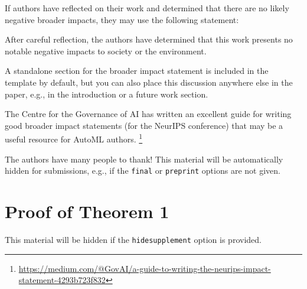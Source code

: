 \documentclass[11pt]{article}
\begin{document}
If authors have reflected on their work and determined that there are no likely
negative broader impacts, they may use the following statement:

\begin{displayquote}
  After careful reflection, the authors have determined that this work presents no notable
  negative impacts to society or the environment.
\end{displayquote}

A standalone section for the broader impact statement is included in the
template by default, but you can also place this discussion anywhere else in the
paper, e.g., in the introduction or a future work section.

The Centre for the Governance of AI has written an excellent guide for writing
good broader impact statements (for the NeurIPS conference) that may be a useful
resource for AutoML authors.%
%
\footnote{\url{https://medium.com/@GovAI/a-guide-to-writing-the-neurips-impact-statement-4293b723f832}}

\begin{acknowledgements}
  The authors have many people to thank! This material will be automatically
  hidden for submissions, e.g., if the \texttt{final} or \texttt{preprint}
  options are not given.
\end{acknowledgements}







\newpage
\appendix
\section{Proof of Theorem 1}

This material will be hidden if the \texttt{hidesupplement} option is provided.
\end{document}

